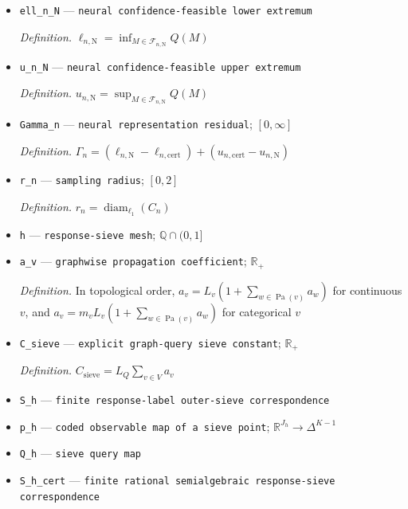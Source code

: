 \documentclass{article}
\begin{document}
\begin{itemize}
  \par\smallskip\noindent\emph{Definition.} \(\mathcal F_{n,\mathrm N}=\{M\in M_{\mathrm N}:p_M\in C_n\}\)
  \item \texttt{ell\_\allowbreak{}n\_\allowbreak{}N} --- \texttt{neural confidence-\allowbreak{}feasible lower extremum}
  \par\smallskip\noindent\emph{Definition.} \(\ell_{n,\mathrm N}=\inf_{M\in\mathcal F_{n,\mathrm N}}Q(M)\)
  \item \texttt{u\_\allowbreak{}n\_\allowbreak{}N} --- \texttt{neural confidence-\allowbreak{}feasible upper extremum}
  \par\smallskip\noindent\emph{Definition.} \(u_{n,\mathrm N}=\sup_{M\in\mathcal F_{n,\mathrm N}}Q(M)\)
  \item \texttt{Gamma\_\allowbreak{}n} --- \texttt{neural representation residual}; \([0,\infty]\)
  \par\smallskip\noindent\emph{Definition.} \(\Gamma_n=(\ell_{n,\mathrm N}-\ell_{n,\mathrm{cert}})+(u_{n,\mathrm{cert}}-u_{n,\mathrm N})\)
  \item \texttt{r\_\allowbreak{}n} --- \texttt{sampling radius}; \([0,2]\)
  \par\smallskip\noindent\emph{Definition.} \(r_n=\operatorname{diam}_{\ell_1}(C_n)\)
  \item \texttt{h} --- \texttt{response-\allowbreak{}sieve mesh}; \(\mathbb Q\cap(0,1]\)
  \item \texttt{a\_\allowbreak{}v} --- \texttt{graphwise propagation coefficient}; \(\mathbb R_+\)
  \par\smallskip\noindent\emph{Definition.} In topological order, \(a_v=L_v(1+\sum_{w\in\operatorname{Pa}(v)}a_w)\) for continuous \(v\), and \(a_v=m_vL_v(1+\sum_{w\in\operatorname{Pa}(v)}a_w)\) for categorical \(v\)
  \item \texttt{C\_\allowbreak{}sieve} --- \texttt{explicit graph-\allowbreak{}query sieve constant}; \(\mathbb R_+\)
  \par\smallskip\noindent\emph{Definition.} \(C_{\mathrm{sieve}}=L_Q\sum_{v\in V}a_v\)
  \item \texttt{S\_\allowbreak{}h} --- \texttt{finite response-\allowbreak{}label outer-\allowbreak{}sieve correspondence}
  \item \texttt{p\_\allowbreak{}h} --- \texttt{coded observable map of a sieve point}; \(\mathbb R^{J_h}\to\Delta^{K-1}\)
  \item \texttt{Q\_\allowbreak{}h} --- \texttt{sieve query map}
  \item \texttt{S\_\allowbreak{}h\_\allowbreak{}cert} --- \texttt{finite rational semialgebraic response-\allowbreak{}sieve correspondence}

\end{itemize}
\end{document}
